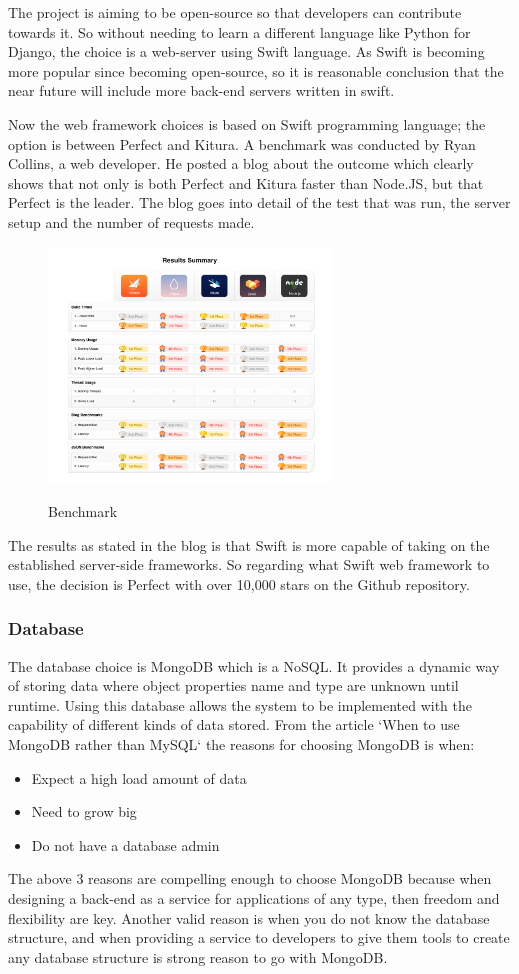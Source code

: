 The project is aiming to be open-source so that developers can contribute towards it. So without needing to learn a different language like Python for Django, the choice is a web-server using Swift language. As Swift is becoming more popular since becoming open-source, so it is reasonable conclusion that the near future will include more back-end servers written in swift.

Now the web framework choices is based on Swift programming language; the option is between Perfect and Kitura. A benchmark was conducted by Ryan Collins, a web developer. He posted a blog about the outcome \cite{benchmark} which clearly shows that not only is both Perfect and Kitura faster than Node.JS, but that Perfect is the leader. The blog goes into detail of the test that was run, the server setup and the number of requests made.

\begin{figure}[!h]
    \caption{Benchmark}
    \centering
    \includegraphics[width=75mm]{images/benchmarks}
    \label{fig:label}
\end{figure}

The results as stated in the blog is that Swift is more capable of taking on the established server-side frameworks. So regarding what Swift web framework to use, the decision is Perfect with over 10,000 stars on the Github repository. \cite{github1} 

\subsubsection{Database}
The database choice is MongoDB which is a NoSQL. It provides a dynamic way of storing data where object properties name and type are unknown until runtime. Using this database allows the system to be implemented with the capability of different kinds of data stored. From the article `When to use MongoDB rather than MySQL` \cite{database} the reasons for choosing MongoDB is when:
\begin{itemize}
  \item Expect a high load amount of data
  \item Need to grow big 
  \item Do not have a database admin
\end{itemize}
The above 3 reasons are compelling enough to choose MongoDB because when designing a back-end as a service for applications of any type, then freedom and flexibility are key. Another valid reason is when you do not know the database structure, and when providing a service to developers to give them tools to create any database structure is strong reason to go with MongoDB. 


